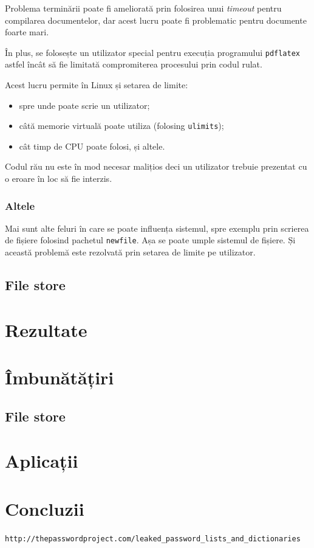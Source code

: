 \documentclass[a4wide,12pt]{report}
\newcommand{\eng}[1]{\emph{#1}} %
\newcommand{\cod}[1]{\texttt{#1}}
\newcommand{\url}[1]{\texttt{#1}}
\newcommand{\capfara}[1]{
    \chapter*{#1}
    \addcontentsline{toc}{chapter}{#1}
}
\begin{document}
Problema terminării poate fi ameliorată prin folosirea unui \eng{timeout} pentru
compilarea documentelor, dar acest lucru poate fi problematic pentru documente
foarte mari.

În plus, se folosește un utilizator special pentru execuția programului
\cod{pdflatex} astfel încât să fie limitată compromiterea procesului prin codul
rulat.

Acest lucru permite în Linux și setarea de limite:

\begin{itemize}
\item spre unde poate scrie un utilizator;
\item câtă memorie virtuală poate utiliza (folosing \cod{ulimits});
\item cât timp de CPU poate folosi, și altele.
\end{itemize}

Codul rău nu este în mod necesar malițios deci un utilizator trebuie prezentat
cu o eroare în loc să fie interzis.

\subsection{Altele}

Mai sunt alte feluri în care se poate influența sistemul, spre exemplu prin
scrierea de fișiere folosind pachetul \cod{newfile}. Așa se poate umple sistemul
de fișiere. Și această problemă este rezolvată prin setarea de limite pe
utilizator.

\section{File store}

\chapter{Rezultate}

\chapter{Îmbunătățiri}

\section{File store}

\chapter{Aplicații}

\capfara{Concluzii}

\begin{thebibliography}{1}

\url{http://thepasswordproject.com/leaked\_password\_lists\_and\_dictionaries}

\end{thebibliography}
\end{document}
